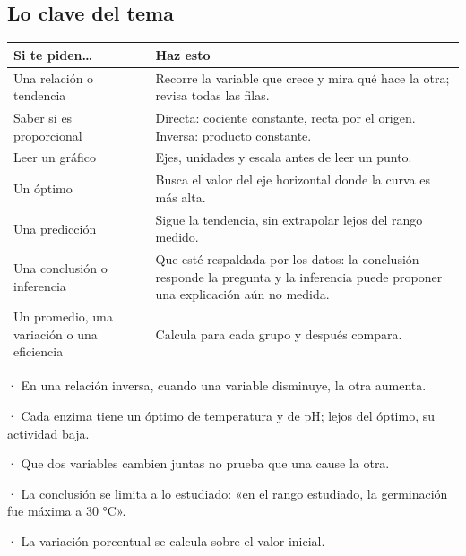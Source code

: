 \subsection{Lo clave del tema}
\begin{center}\small
\begin{tabularx}{\linewidth}{@{}>{\raggedright\arraybackslash\hsize=1.00\hsize}X>{\raggedright\arraybackslash\hsize=1.00\hsize}X@{}}
\toprule
\textbf{Si te piden\dots{}} & \textbf{Haz esto} \\
\midrule
Una relación o tendencia & Recorre la variable que crece y mira qué hace la otra; revisa todas las filas. \\
Saber si es proporcional & Directa: cociente constante, recta por el origen. Inversa: producto constante. \\
Leer un gráfico & Ejes, unidades y escala antes de leer un punto. \\
Un óptimo & Busca el valor del eje horizontal donde la curva es más alta. \\
Una predicción & Sigue la tendencia, sin extrapolar lejos del rango medido. \\
Una conclusión o inferencia & Que esté respaldada por los datos: la conclusión responde la pregunta y la inferencia puede proponer una explicación aún no medida. \\
Un promedio, una variación o una eficiencia & Calcula para cada grupo y después compara. \\
\bottomrule
\end{tabularx}
\end{center}
 
\begin{clave}[{Recuerda}] · En una relación inversa, cuando una variable disminuye, la otra aumenta.\par · Cada enzima tiene un óptimo de temperatura y de pH; lejos del óptimo, su actividad baja.\par · Que dos variables cambien juntas no prueba que una cause la otra.\par · La conclusión se limita a lo estudiado: «en el rango estudiado, la germinación fue máxima a 30 °C».\par · La variación porcentual se calcula sobre el valor inicial.\end{clave}
 
